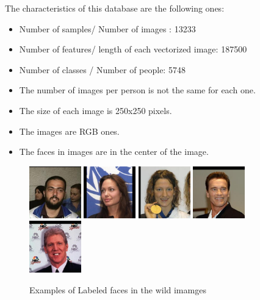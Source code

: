 The characteristics of this database are the following ones:
\begin{itemize}
 \item Number of samples/ Number of images : 13233
 \item Number of features/ length of each vectorized image: 187500
 \item Number of classes / Number of people: 5748
\item The number of images per person is not the same for each one.
\item The size of each image is 250x250 pixels.
\item The images are RGB ones.
\item The faces in images are in the center of the image.\\
\end{itemize}
\begin{figure}[htb]
\centering
\includegraphics[width=0.2\textwidth]{images_databases/LFW/1.jpg}
\includegraphics[width=0.2\textwidth]{images_databases/LFW/2.jpg}
\includegraphics[width=0.2\textwidth]{images_databases/LFW/3.jpg}
\includegraphics[width=0.2\textwidth]{images_databases/LFW/4.jpg}
\includegraphics[width=0.2\textwidth]{images_databases/LFW/5.jpg}
\caption{Examples of Labeled faces in the wild imamges} \label{fig:LFW1}
\end{figure}

